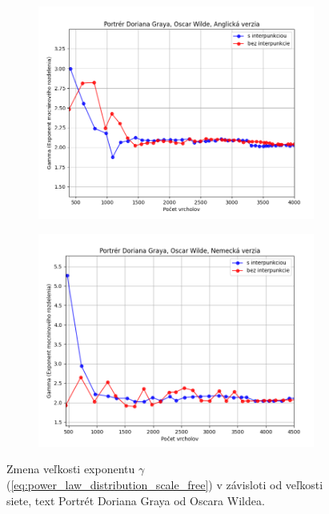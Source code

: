 \begin{figure}[htbp]
    \centering
    \begin{subfigure}[b]{0.9\textwidth}
        \includegraphics[width=\textwidth]{images/Growth/Screenshot_15.png}
    \end{subfigure}

    \vspace{0.3cm}

    \begin{subfigure}[b]{0.9\textwidth}
        \includegraphics[width=\textwidth]{images/Growth/Screenshot_16.png}
    \end{subfigure}
    
    \vspace{0.3cm}
    \caption{Zmena veľkosti exponentu $\gamma$ (\ref{eq:power_law_distribution_scale_free}) v závisloti od veľkosti siete, text Portrét Doriana Graya od Oscara Wildea.}\label{fig:growthDorian}
\end{figure}

